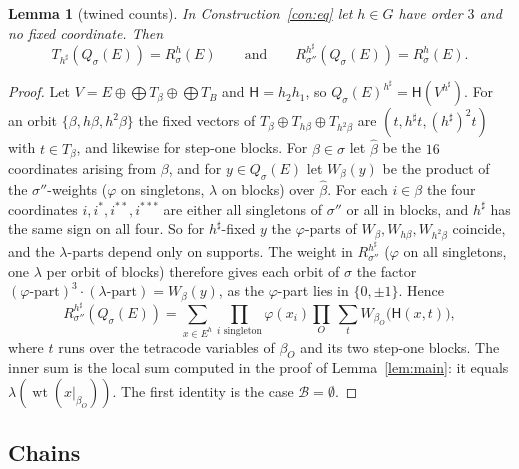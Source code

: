 \documentclass[11pt]{amsart}
\newtheorem{lemma}[theorem]{Lemma}
\theoremstyle{definition}
\newcommand{\wt}{\operatorname{wt}}
\newcommand{\cB}{\mathcal{B}}
\begin{document}
\begin{lemma}[twined counts]\label{lem:twined}
In Construction~\ref{con:eq} let $h\in G$ have order $3$ and no fixed coordinate. Then
\[
  T_{h^\sharp}(Q_\sigma(E))=R^h_\sigma(E)\qquad\text{and}\qquad R^{h^\sharp}_{\sigma''}(Q_\sigma(E))=
  R^h_\sigma(E).
\]
\end{lemma}

\begin{proof}
Let $V=E\oplus\bigoplus T_\beta\oplus\bigoplus T_B$ and $\mathsf H=h_2h_1$, so
$Q_\sigma(E)^{h^\sharp}=\mathsf H(V^{h^\sharp})$. For an orbit $\{\beta,h\beta,h^2\beta\}$ the fixed
vectors of $T_\beta\oplus T_{h\beta}\oplus T_{h^2\beta}$ are $(t,h^\sharp t,(h^\sharp)^2t)$ with
$t\in T_\beta$, and likewise for step-one blocks. For $\beta\in\sigma$ let $\hat\beta$ be the $16$
coordinates arising from $\beta$, and for $y\in Q_\sigma(E)$ let $W_\beta(y)$ be the product of the
$\sigma''$-weights ($\varphi$ on singletons, $\lambda$ on blocks) over $\hat\beta$. For each
$i\in\beta$ the four coordinates $i,i^*,i^{**},i^{***}$ are either all singletons of $\sigma''$ or all
in blocks, and $h^\sharp$ has the same sign on all four. So for $h^\sharp$-fixed $y$ the
$\varphi$-parts of $W_\beta,W_{h\beta},W_{h^2\beta}$ coincide, and the $\lambda$-parts depend only
on supports. The weight in $R^{h^\sharp}_{\sigma''}$ ($\varphi$ on all singletons, one $\lambda$ per
orbit of blocks) therefore gives each orbit of $\sigma$ the factor
$(\varphi\text{-part})^3\cdot(\lambda\text{-part})=W_\beta(y)$, as the $\varphi$-part lies in
$\{0,\pm1\}$. Hence
\[
  R^{h^\sharp}_{\sigma''}(Q_\sigma(E))=\sum_{x\in E^h}\prod_{i\text{ singleton}}\varphi(x_i)
  \prod_O\ \sum_tW_{\beta_O}\bigl(\mathsf H(x,t)\bigr),
\]
where $t$ runs over the tetracode variables of $\beta_O$ and its two step-one blocks. The inner sum is
the local sum computed in the proof of Lemma~\ref{lem:main}: it equals $\lambda(\wt(x|_{\beta_O}))$.
The first identity is the case $\cB=\emptyset$.
\end{proof}

\subsection{Chains}
\end{document}
